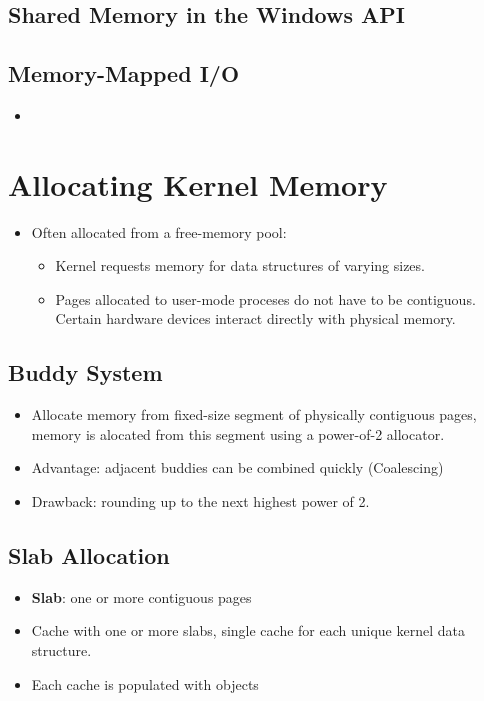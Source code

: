 \documentclass[10pt]{report}
\begin{document}
		\subsection{Shared Memory in the Windows API}

		\subsection{Memory-Mapped I/O}
			\begin{itemize}
				\item
			\end{itemize}

	\section{Allocating Kernel Memory}
		\begin{itemize}
			\item Often allocated from a free-memory pool:
			\begin{itemize}
				\item Kernel requests memory for data structures of varying sizes.
				\item Pages allocated to user-mode proceses do not have to be contiguous. Certain hardware devices interact directly with physical memory.
			\end{itemize}
		\end{itemize}

		\subsection{Buddy System}
			\begin{itemize}
				\item Allocate memory from fixed-size segment of physically contiguous pages, memory is alocated from this segment using a power-of-2 allocator.
				\item Advantage: adjacent buddies can be combined quickly (Coalescing)
				\item Drawback: rounding up to the next highest power of 2.
			\end{itemize}

		\subsection{Slab Allocation}
			\begin{itemize}
				\item \textbf{Slab}: one or more contiguous pages
				\item Cache with one or more slabs, single cache for each unique kernel data structure.
				\item Each cache is populated with objects
			\end{itemize}
\end{document}
